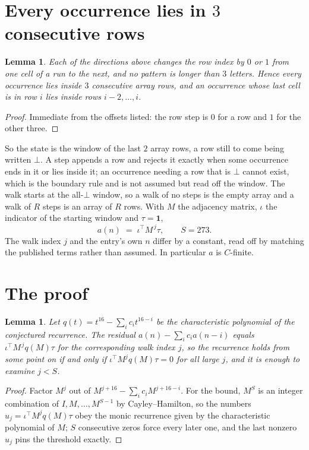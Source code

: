 \documentclass[11pt,a4paper]{article}
\theoremstyle{plain}
\newtheorem{lemma}[theorem]{Lemma}
\theoremstyle{definition}
\begin{document}
\section{Every occurrence lies in $3$ consecutive rows}

\begin{lemma}\label{lem:win}
Each of the directions above changes the row index by $0$ or $1$ from one cell of a run to the
next, and no pattern is longer than $3$ letters. Hence every occurrence lies inside $3$
consecutive array rows, and an occurrence whose last cell is in row $i$ lies inside rows
$i-2,\dots,i$.
\end{lemma}

\begin{proof}
Immediate from the offsets listed: the row step is $0$ for a row and $1$ for the other three.
\end{proof}

So the state is the window of the last $2$ array rows, a row still to come being written
$\bot$. A step appends a row and rejects it exactly when some occurrence ends in it or lies
inside it; an occurrence needing a row that is $\bot$ cannot exist, which is the boundary rule
and is not assumed but read off the window. The walk starts at the all-$\bot$ window, so a walk
of no steps is the empty array and a walk of $R$ steps is an array of $R$ rows. With $M$ the
adjacency matrix, $\iota$ the indicator of the starting window and $\tau=\mathbf{1}$,
\[
a(n)\;=\;\iota^{\!\top}M^{\,j}\tau ,\qquad S=273.
\]
The walk index $j$ and the entry's own $n$ differ by a constant, read off by matching the
published terms rather than assumed. In particular $a$ is $C$-finite.

\section{The proof}

\begin{lemma}\label{lem:crit}
Let $q(t)=t^{16}-\sum_i c_it^{16-i}$ be the characteristic polynomial of the
conjectured recurrence. The residual $a(n)-\sum_ic_ia(n-i)$ equals
$\iota^{\!\top}M^{\,j}q(M)\tau$ for the corresponding walk index $j$, so the recurrence
holds from some point on if and only if $\iota^{\!\top}M^{j}q(M)\tau=0$ for all large $j$,
and it is enough to examine $j<S$.
\end{lemma}

\begin{proof}
Factor $M^{j}$ out of $M^{j+16}-\sum_ic_iM^{j+16-i}$. For the bound, $M^{S}$
is an integer combination of $I,M,\dots,M^{S-1}$ by Cayley--Hamilton, so the numbers
$u_j=\iota^{\!\top}M^{j}q(M)\tau$ obey the monic recurrence given by the characteristic
polynomial of $M$; $S$ consecutive zeros force every later one, and the last nonzero $u_j$
pins the threshold exactly.
\end{proof}
\end{document}
